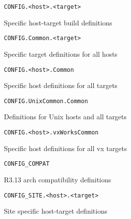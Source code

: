\begin{verbatim}CONFIG.<host>.<target>
\end{verbatim}\begin{description}\item Specific host-target build definitions

\end{description}\begin{verbatim}CONFIG.Common.<target>
\end{verbatim}\begin{description}\item Specific target definitions for all hosts

\end{description}\begin{verbatim}CONFIG.<host>.Common
\end{verbatim}\begin{description}\item Specific host definitions for all targets

\end{description}\begin{verbatim}CONFIG.UnixCommon.Common
\end{verbatim}\begin{description}\item Definitions for Unix hosts and all targets

\end{description}\begin{verbatim}CONFIG.<host>.vxWorksCommon
\end{verbatim}\begin{description}\item Specific host definitions for all vx targets

\end{description}\begin{verbatim}CONFIG_COMPAT
\end{verbatim}\begin{description}\item R3.13 arch compatibility definitions

\end{description}\begin{verbatim}CONFIG_SITE.<host>.<target>
\end{verbatim}\begin{description}\item Site specific host-target definitions


\end{description}
